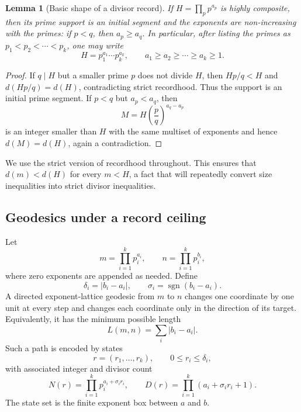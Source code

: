 \documentclass[11pt]{article}
\numberwithin{equation}{section}
\theoremstyle{blueplain}
\newtheorem{lemma}[theorem]{Lemma}
\theoremstyle{bluedef}
\begin{document}
\begin{lemma}[Basic shape of a divisor record]
\label{lem:basic-hcn-shape}
If $H=\prod_p p^{a_p}$ is highly composite, then its prime support is an initial segment and the exponents are non-increasing with the primes: if $p<q$, then $a_p\ge a_q$.  In particular, after listing the primes as $p_1<p_2<\cdots<p_k$, one may write
\begin{equation}
 H=p_1^{a_1}\cdots p_k^{a_k},
 \qquad
 a_1\ge a_2\ge\cdots\ge a_k\ge1.
 \label{eq:hcn-profile-shape}
\end{equation}
\end{lemma}

\begin{proof}
If $q\mid H$ but a smaller prime $p$ does not divide $H$, then $Hp/q<H$ and $d(Hp/q)=d(H)$, contradicting strict recordhood.  Thus the support is an initial prime segment.  If $p<q$ but $a_p<a_q$, then
\[
 M=H\left(\frac pq\right)^{a_q-a_p}
\]
is an integer smaller than $H$ with the same multiset of exponents and hence $d(M)=d(H)$, again a contradiction.
\end{proof}

We use the strict version of recordhood throughout.  This ensures that $d(m)<d(H)$ for every $m<H$, a fact that will repeatedly convert size inequalities into strict divisor inequalities.

\subsection{Geodesics under a record ceiling}

Let
\[
 m=\prod_{i=1}^k p_i^{a_i},
 \qquad
 n=\prod_{i=1}^k p_i^{b_i},
\]
where zero exponents are appended as needed.  Define
\begin{equation}
 \delta_i=|b_i-a_i|,
 \qquad
 \sigma_i=\operatorname{sgn}(b_i-a_i).
 \label{eq:delta-sigma}
\end{equation}
A directed exponent-lattice geodesic from $m$ to $n$ changes one coordinate by one unit at every step and changes each coordinate only in the direction of its target.  Equivalently, it has the minimum possible length
\begin{equation}
 L(m,n)=\sum_i|b_i-a_i|.
 \label{eq:l1-length}
\end{equation}
Such a path is encoded by states
\begin{equation}
 r=(r_1,\ldots,r_k),
 \qquad 0\le r_i\le\delta_i,
 \label{eq:box-state}
\end{equation}
with associated integer and divisor count
\begin{equation}
 N(r)=\prod_{i=1}^k p_i^{a_i+\sigma_i r_i},
 \qquad
 D(r)=\prod_{i=1}^k(a_i+\sigma_i r_i+1).
 \label{eq:state-ND}
\end{equation}
The state set is the finite exponent box between $a$ and $b$.
\end{document}
